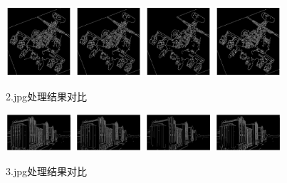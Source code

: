 \documentclass{article}
\begin{document}
\begin{figure}[h]
    \centering
    \includegraphics[width=0.22\textwidth]{./result/2_80_32}
    \includegraphics[width=0.22\textwidth]{./result/2_100_40}
    \includegraphics[width=0.22\textwidth]{./result/2_150_60}
    \includegraphics[width=0.22\textwidth]{./result/2_standard}
    \caption{2.jpg处理结果对比}
\end{figure}

\begin{figure}[h]
    \centering
    \includegraphics[width=0.22\textwidth]{./result/3_80_32}
    \includegraphics[width=0.22\textwidth]{./result/3_100_40}
    \includegraphics[width=0.22\textwidth]{./result/3_150_60}
    \includegraphics[width=0.22\textwidth]{./result/3_standard}
    \caption{3.jpg处理结果对比}
\end{figure}
\end{document}
